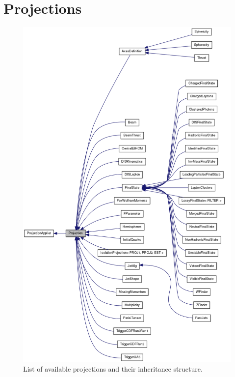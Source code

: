

\section{Projections}

\begin{figure}[p]
  \centering
  \includegraphics[height=0.98\textheight]{projections.png}
  \caption{List of available projections and their inheritance structure.}
  \label{fig:projections}
\end{figure}

